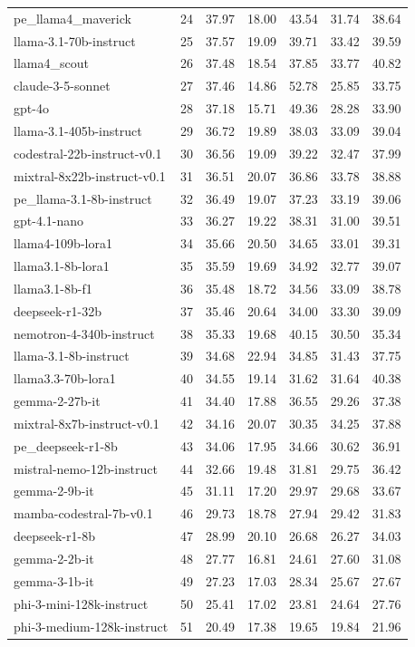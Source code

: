 \begin{tabular}{lrrrrrr}
pe_llama4_maverick & 24 & 37.97 & 18.00 & 43.54 & 31.74 & 38.64 \\
llama-3.1-70b-instruct & 25 & 37.57 & 19.09 & 39.71 & 33.42 & 39.59 \\
llama4_scout & 26 & 37.48 & 18.54 & 37.85 & 33.77 & 40.82 \\
claude-3-5-sonnet & 27 & 37.46 & 14.86 & 52.78 & 25.85 & 33.75 \\
gpt-4o & 28 & 37.18 & 15.71 & 49.36 & 28.28 & 33.90 \\
llama-3.1-405b-instruct & 29 & 36.72 & 19.89 & 38.03 & 33.09 & 39.04 \\
codestral-22b-instruct-v0.1 & 30 & 36.56 & 19.09 & 39.22 & 32.47 & 37.99 \\
mixtral-8x22b-instruct-v0.1 & 31 & 36.51 & 20.07 & 36.86 & 33.78 & 38.88 \\
pe_llama-3.1-8b-instruct & 32 & 36.49 & 19.07 & 37.23 & 33.19 & 39.06 \\
gpt-4.1-nano & 33 & 36.27 & 19.22 & 38.31 & 31.00 & 39.51 \\
llama4-109b-lora1 & 34 & 35.66 & 20.50 & 34.65 & 33.01 & 39.31 \\
llama3.1-8b-lora1 & 35 & 35.59 & 19.69 & 34.92 & 32.77 & 39.07 \\
llama3.1-8b-f1 & 36 & 35.48 & 18.72 & 34.56 & 33.09 & 38.78 \\
deepseek-r1-32b & 37 & 35.46 & 20.64 & 34.00 & 33.30 & 39.09 \\
nemotron-4-340b-instruct & 38 & 35.33 & 19.68 & 40.15 & 30.50 & 35.34 \\
llama-3.1-8b-instruct & 39 & 34.68 & 22.94 & 34.85 & 31.43 & 37.75 \\
llama3.3-70b-lora1 & 40 & 34.55 & 19.14 & 31.62 & 31.64 & 40.38 \\
gemma-2-27b-it & 41 & 34.40 & 17.88 & 36.55 & 29.26 & 37.38 \\
mixtral-8x7b-instruct-v0.1 & 42 & 34.16 & 20.07 & 30.35 & 34.25 & 37.88 \\
pe_deepseek-r1-8b & 43 & 34.06 & 17.95 & 34.66 & 30.62 & 36.91 \\
mistral-nemo-12b-instruct & 44 & 32.66 & 19.48 & 31.81 & 29.75 & 36.42 \\
gemma-2-9b-it & 45 & 31.11 & 17.20 & 29.97 & 29.68 & 33.67 \\
mamba-codestral-7b-v0.1 & 46 & 29.73 & 18.78 & 27.94 & 29.42 & 31.83 \\
deepseek-r1-8b & 47 & 28.99 & 20.10 & 26.68 & 26.27 & 34.03 \\
gemma-2-2b-it & 48 & 27.77 & 16.81 & 24.61 & 27.60 & 31.08 \\
gemma-3-1b-it & 49 & 27.23 & 17.03 & 28.34 & 25.67 & 27.67 \\
phi-3-mini-128k-instruct & 50 & 25.41 & 17.02 & 23.81 & 24.64 & 27.76 \\
phi-3-medium-128k-instruct & 51 & 20.49 & 17.38 & 19.65 & 19.84 & 21.96 \\
\bottomrule
\end{tabular}

